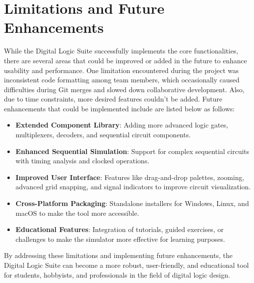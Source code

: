 \section{Limitations and Future Enhancements}
While the Digital Logic Suite successfully implements the core functionalities, there are several areas that could be improved or added in the future to enhance usability and performance. One limitation encountered during the project was inconsistent code formatting among team members, which occasionally caused difficulties during Git merges and slowed down collaborative development. Also, due to time constraints, more desired features couldn't be added. Future enhancements that could be implemented include are listed below as follows:
\begin{itemize}
    \item \textbf{Extended Component Library}: Adding more advanced logic gates, multiplexers, decoders, and sequential circuit components.
    \item \textbf{Enhanced Sequential Simulation}: Support for complex sequential circuits with timing analysis and clocked operations.
    \item \textbf{Improved User Interface}: Features like drag-and-drop palettes, zooming, advanced grid snapping, and signal indicators to improve circuit visualization.
    \item \textbf{Cross-Platform Packaging}: Standalone installers for Windows, Linux, and macOS to make the tool more accessible.
    \item \textbf{Educational Features}: Integration of tutorials, guided exercises, or challenges to make the simulator more effective for learning purposes.
\end{itemize}

\vspace{0.5cm}
By addressing these limitations and implementing future enhancements, the Digital Logic Suite can become a more robust, user-friendly, and educational tool for students, hobbyists, and professionals in the field of digital logic design.
\clearpage